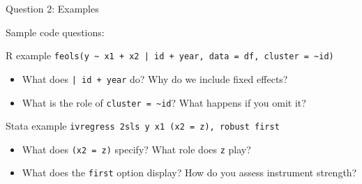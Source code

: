 \documentclass[dvipsnames,hyperref={pdfpagelabels=false}]{beamer}
\begin{document}
\begin{frame}{Question 2: Examples}

\vspace{0.1cm}
\small
Sample code questions:

\vspace{0.25cm}
\begin{block}{R example}
\texttt{feols(y \textasciitilde{} x1 + x2 | id + year, data = df, cluster = \textasciitilde{}id)}
\begin{itemize}
	\item What does \texttt{| id + year} do? Why do we include fixed effects?
	\item What is the role of \texttt{cluster = \textasciitilde{}id}? What happens if you omit it?
\end{itemize}
\end{block}

\vspace{0.2cm}
\begin{block}{Stata example}
\texttt{ivregress 2sls y x1 (x2 = z), robust first}
\begin{itemize}
	\item What does \texttt{(x2 = z)} specify? What role does \texttt{z} play?
	\item What does the \texttt{first} option display? How do you assess instrument strength?
\end{itemize}
\end{block}

\end{frame}
\end{document}

